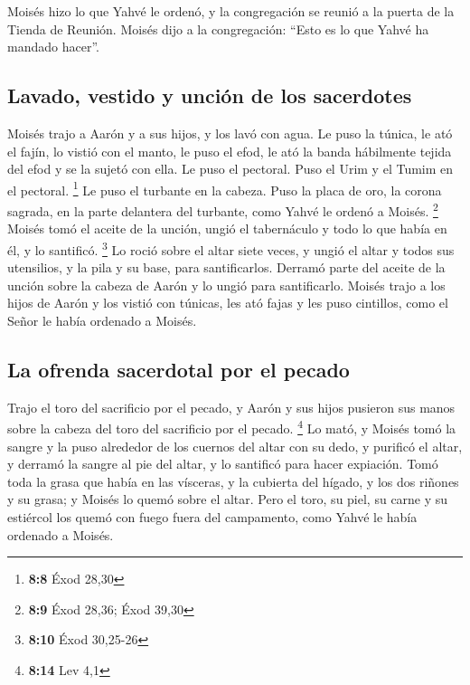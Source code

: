  Moisés hizo lo que Yahvé le ordenó, y la congregación se
reunió a la puerta de la Tienda de Reunión.  Moisés dijo a
la congregación: ``Esto es lo que Yahvé ha mandado hacer''.

\hypertarget{lavado-vestido-y-unciuxf3n-de-los-sacerdotes}{%
\subsection{Lavado, vestido y unción de los
sacerdotes}\label{lavado-vestido-y-unciuxf3n-de-los-sacerdotes}}

 Moisés trajo a Aarón y a sus hijos, y los lavó con agua.
 Le puso la túnica, le ató el fajín, lo vistió con el
manto, le puso el efod, le ató la banda hábilmente tejida del efod y se
la sujetó con ella.  Le puso el pectoral. Puso el Urim y
el Tumim en el pectoral. \footnote{\textbf{8:8} Éxod 28,30}
 Le puso el turbante en la cabeza. Puso la placa de oro,
la corona sagrada, en la parte delantera del turbante, como Yahvé le
ordenó a Moisés. \footnote{\textbf{8:9} Éxod 28,36; Éxod 39,30}
 Moisés tomó el aceite de la unción, ungió el tabernáculo
y todo lo que había en él, y lo santificó. \footnote{\textbf{8:10} Éxod
  30,25-26}  Lo roció sobre el altar siete veces, y ungió
el altar y todos sus utensilios, y la pila y su base, para
santificarlos.  Derramó parte del aceite de la unción
sobre la cabeza de Aarón y lo ungió para santificarlo. 
Moisés trajo a los hijos de Aarón y los vistió con túnicas, les ató
fajas y les puso cintillos, como el Señor le había ordenado a Moisés.

\hypertarget{la-ofrenda-sacerdotal-por-el-pecado}{%
\subsection{La ofrenda sacerdotal por el
pecado}\label{la-ofrenda-sacerdotal-por-el-pecado}}

 Trajo el toro del sacrificio por el pecado, y Aarón y
sus hijos pusieron sus manos sobre la cabeza del toro del sacrificio por
el pecado. \footnote{\textbf{8:14} Lev 4,1}  Lo mató, y
Moisés tomó la sangre y la puso alrededor de los cuernos del altar con
su dedo, y purificó el altar, y derramó la sangre al pie del altar, y lo
santificó para hacer expiación.  Tomó toda la grasa que
había en las vísceras, y la cubierta del hígado, y los dos riñones y su
grasa; y Moisés lo quemó sobre el altar.  Pero el toro,
su piel, su carne y su estiércol los quemó con fuego fuera del
campamento, como Yahvé le había ordenado a Moisés.

